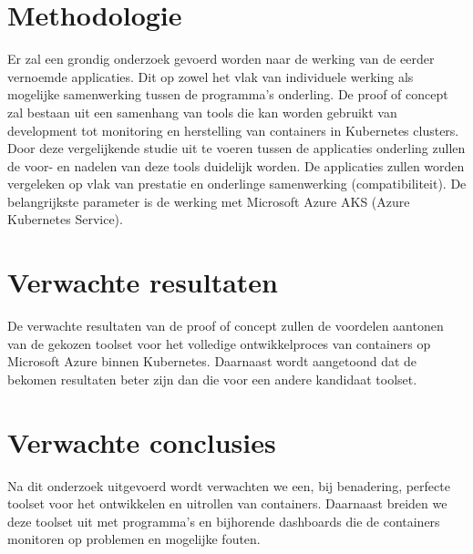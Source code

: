 \section{Methodologie}
\label{sec:methodologie}

Er zal een grondig onderzoek gevoerd worden naar de werking van de eerder vernoemde applicaties. Dit op zowel het vlak van individuele werking als mogelijke samenwerking tussen de programma's onderling. De proof of concept zal bestaan uit een samenhang van tools die kan worden gebruikt van development tot monitoring en herstelling van containers in Kubernetes clusters. Door deze vergelijkende studie uit te voeren tussen de applicaties onderling zullen de voor- en nadelen van deze tools duidelijk worden. De applicaties zullen worden vergeleken op vlak van prestatie en onderlinge samenwerking (compatibiliteit). De belangrijkste parameter is de werking met Microsoft Azure AKS (Azure Kubernetes Service).


\section{Verwachte resultaten}
\label{sec:verwachte_resultaten}

De verwachte resultaten van de proof of concept zullen de voordelen aantonen van de gekozen toolset voor het volledige ontwikkelproces van containers op Microsoft Azure binnen Kubernetes. Daarnaast wordt aangetoond dat de bekomen resultaten beter zijn dan die voor een andere kandidaat toolset.


\section{Verwachte conclusies}
\label{sec:verwachte_conclusies}

Na dit onderzoek uitgevoerd wordt verwachten we een, bij benadering, perfecte toolset voor het ontwikkelen en uitrollen van containers. Daarnaast breiden we deze toolset uit met programma's en bijhorende dashboards die de containers monitoren op problemen en mogelijke fouten.

